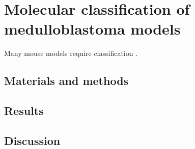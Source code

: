 \chapter{Molecular classification of medulloblastoma models}
\label{ch:mouse-mb-class}

Many mouse models require classification .

\section{Materials and methods}

\section{Results}

\section{Discussion}
